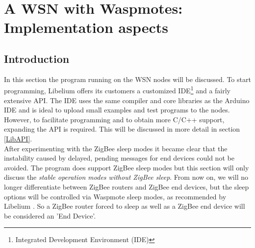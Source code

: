 \section{A WSN with Waspmotes: Implementation aspects}
\subsection{Introduction}
\label{lab5}
In this section the program running on the WSN nodes will be discussed. To start programming, Libelium offers its customers a customized IDE\footnote{Integrated Development Environment (IDE)} and a fairly extensive API. The IDE uses the same compiler and core libraries as the Arduino IDE and is ideal to upload small examples and test programs to the nodes. However, to facilitate programming and to obtain more C/C++ support, expanding the API is required. This will be discussed in more detail in section \ref{LibAPI}.\\
After experimenting with the ZigBee sleep modes it became clear that the instability caused by delayed, pending messages for end devices could not be avoided. The program does support ZigBee sleep modes but this section will only discuss the \textit{stable operation modes without ZigBee sleep}. From now on, we will no longer differentiate between ZigBee routers and ZigBee end devices, but the sleep options will be controlled via Waspmote sleep modes, as recommended by Libelium . So a ZigBee router forced to sleep as well as a ZigBee end device will be considered an 'End Device'. 


